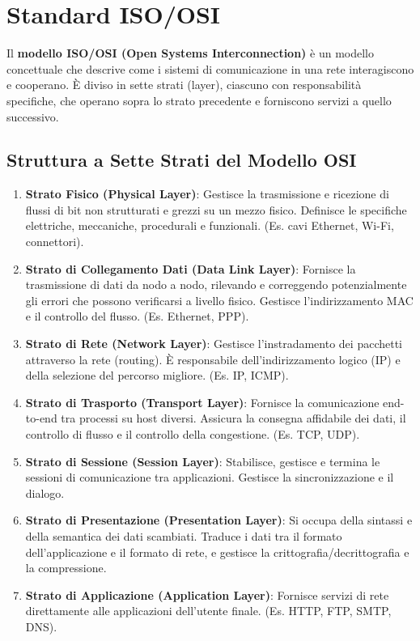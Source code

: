 \section{Standard ISO/OSI}
Il \textbf{modello ISO/OSI (Open Systems Interconnection)} è un modello concettuale che descrive come i sistemi di comunicazione in una rete interagiscono e cooperano. È diviso in sette strati (layer), ciascuno con responsabilità specifiche, che operano sopra lo strato precedente e forniscono servizi a quello successivo.

\subsection{Struttura a Sette Strati del Modello OSI}
\begin{enumerate}
    \item \textbf{Strato Fisico (Physical Layer)}: Gestisce la trasmissione e ricezione di flussi di bit non strutturati e grezzi su un mezzo fisico. Definisce le specifiche elettriche, meccaniche, procedurali e funzionali. (Es. cavi Ethernet, Wi-Fi, connettori).
    \item \textbf{Strato di Collegamento Dati (Data Link Layer)}: Fornisce la trasmissione di dati da nodo a nodo, rilevando e correggendo potenzialmente gli errori che possono verificarsi a livello fisico. Gestisce l'indirizzamento MAC e il controllo del flusso. (Es. Ethernet, PPP).
    \item \textbf{Strato di Rete (Network Layer)}: Gestisce l'instradamento dei pacchetti attraverso la rete (routing). È responsabile dell'indirizzamento logico (IP) e della selezione del percorso migliore. (Es. IP, ICMP).
    \item \textbf{Strato di Trasporto (Transport Layer)}: Fornisce la comunicazione end-to-end tra processi su host diversi. Assicura la consegna affidabile dei dati, il controllo di flusso e il controllo della congestione. (Es. TCP, UDP).
    \item \textbf{Strato di Sessione (Session Layer)}: Stabilisce, gestisce e termina le sessioni di comunicazione tra applicazioni. Gestisce la sincronizzazione e il dialogo.
    \item \textbf{Strato di Presentazione (Presentation Layer)}: Si occupa della sintassi e della semantica dei dati scambiati. Traduce i dati tra il formato dell'applicazione e il formato di rete, e gestisce la crittografia/decrittografia e la compressione.
    \item \textbf{Strato di Applicazione (Application Layer)}: Fornisce servizi di rete direttamente alle applicazioni dell'utente finale. (Es. HTTP, FTP, SMTP, DNS).
\end{enumerate}

